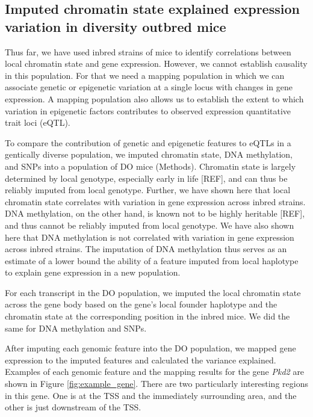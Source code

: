 \documentclass[10pt,letterpaper]{article}
\begin{document}
\hypertarget{imputed-chromatin-state-explained-expression-variation-in-diversity-outbred-mice}{%
\subsection{Imputed chromatin state explained expression variation in
diversity outbred
mice}\label{imputed-chromatin-state-explained-expression-variation-in-diversity-outbred-mice}}

Thus far, we have used inbred strains of mice to identify correlations
between local chromatin state and gene expression. However, we cannot
establish causality in this population. For that we need a mapping
population in which we can associate genetic or epigenetic variation at
a single locus with changes in gene expression. A mapping population
also allows us to establish the extent to which variation in epigenetic
factors contributes to observed expression quantitative trait loci
(eQTL).

To compare the contribution of genetic and epigenetic features to eQTLs
in a gentically diverse population, we imputed chromatin state, DNA
methylation, and SNPs into a population of DO mice (Methods). Chromatin
state is largely determined by local genotype, especially early in life
{[}REF{]}, and can thus be reliably imputed from local genotype.
Further, we have shown here that local chromatin state correlates with
variation in gene expression across inbred strains. DNA methylation, on
the other hand, is known not to be highly heritable {[}REF{]}, and thus
cannot be reliably imputed from local genotype. We have also shown here
that DNA methylation is not correlated with variation in gene expression
across inbred strains. The imputation of DNA methylation thus serves as
an estimate of a lower bound the ability of a feature imputed from local
haplotype to explain gene expression in a new population.

For each transcript in the DO population, we imputed the local chromatin
state across the gene body based on the gene's local founder haplotype
and the chromatin state at the corresponding position in the inbred
mice. We did the same for DNA methylation and SNPs.

After imputing each genomic feature into the DO population, we mapped
gene expression to the imputed features and calculated the variance
explained. Examples of each genomic feature and the mapping results for
the gene \textit{Pkd2} are shown in Figure \ref{fig:example_gene}. There
are two particularly interesting regions in this gene. One is at the TSS
and the immediately surrounding area, and the other is just downstream
of the TSS.
\end{document}
